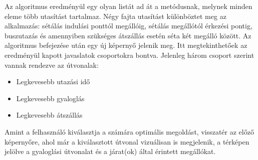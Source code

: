 Az algoritmus eredményül egy olyan listát ad át a  metódusnak, melynek minden eleme több utasítást tartalmaz.
Négy fajta utasítást különböztet meg az alkalmazás: sétálás indulási ponttól megállóig, sétálás megállótól érkezési pontig, buszutazás és amennyiben szükséges átszállás esetén séta két megálló között.
Az algoritmus befejezése után egy új képernyő jelenik meg.
Itt megtekinthetőek az eredményül kapott javaslatok csoportokra bontva.
Jelenleg három csoport szerint vannak rendezve az útvonalak:
\begin{itemize}
	\item Legkevesebb utazási idő
	\item Legkevesebb gyaloglás
	\item Legkevesebb átszállás
\end{itemize}

Amint a felhasználó kiválasztja a számára optimális megoldást, visszatér az előző képernyőre, ahol már a kiválasztott útvonal vizuálisan is megjelenik, a térképen jelölve a gyaloglási útvonalat és a járat(ok) által érintett megállókat.
\newpage